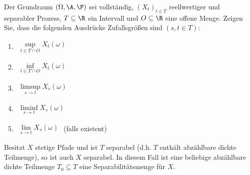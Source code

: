 \begin{aufgabenr}\label{aufg:13}\enter
	Der Grundraum $(\Omega,\A,\P)$ sei vollständig, $(X_t)_{t\in T}$ reellwertiger und separabler Prozess, $T\subseteq\R$ ein Intervall und $O\subseteq\R$ eine offene Menge.
	Zeigen Sie, dass die folgenden Ausdrücke Zufallsgrößen sind $(s,t\in T)$:
	\begin{enumerate}
		\item $\begin{aligned}
			\sup\limits_{t\in T\cap O} X_t(\omega)
		\end{aligned}$ \label{item:aufg13_1}
		\item $\begin{aligned}
			\inf\limits_{t\in T\cap O} X_t(\omega)
		\end{aligned}$ \label{item:aufg13_2}
		\item $\begin{aligned}
			\limsup\limits_{s\to t} X_s(\omega)
		\end{aligned}$ \label{item:aufg13_3}
		\item $\begin{aligned}
			\liminf\limits_{s\to t} X_s(\omega)
		\end{aligned}$ \label{item:aufg13_4}
		\item $\begin{aligned}
			\lim\limits_{s\to t} X_s(\omega)
		\end{aligned}$ (falls existent) \label{item:aufg13_5}
	\end{enumerate}
\end{aufgabenr}

\begin{aufgabenr}\label{aufg:14}\enter
	Besitzt $X$ stetige Pfade und ist $T$ separabel (d.h. $T$ enthält abzählbare dichte Teilmenge), so ist auch $X$ separabel.
	In diesem Fall ist eine beliebige abzählbare dichte Teilmenge $T_0\subseteq T$ eine Separabilitätsmenge für $X$.
\end{aufgabenr}


